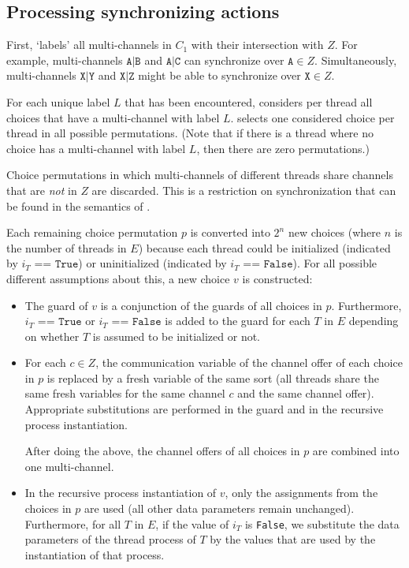\subsection{Processing synchronizing actions}

First, \lpeq{} `labels' all multi-channels in $C_1$ with their intersection with $Z$.
For example, multi-channels $\texttt{A|B}$ and $\texttt{A|C}$ can synchronize over $\texttt{A} \in Z$.
Simultaneously, multi-channels $\texttt{X|Y}$ and $\texttt{X|Z}$ might be able to synchronize over $\texttt{X} \in Z$.

For each unique label $L$ that has been encountered, \lpeq{} considers per thread all choices that have a multi-channel with label $L$.
\lpeq{} selects one considered choice per thread in all possible permutations.
(Note that if there is a thread where no choice has a multi-channel with label $L$, then there are zero permutations.)

Choice permutations in which multi-channels of different threads share channels that are \emph{not} in $Z$ are discarded.
This is a restriction on synchronization that can be found in the semantics of \txs{}.

Each remaining choice permutation $p$ is converted into $2^n$ new choices (where $n$ is the number of threads in $E$) because each thread could be initialized (indicated by $i_T \texttt{ == True}$) or uninitialized (indicated by $i_T \texttt{ == False}$).
For all possible different assumptions about this, a new choice $v$ is constructed:
\begin{itemize}
\item The guard of $v$ is a conjunction of the guards of all choices in $p$.
Furthermore, $i_T \texttt{ == True}$ or $i_T \texttt{ == False}$ is added to the guard for each $T$ in $E$ depending on whether $T$ is assumed to be initialized or not.
\item For each $c \in Z$, the communication variable of the channel offer of each choice in $p$ is replaced by a fresh variable of the same sort (all threads share the same fresh variables for the same channel $c$ and the same channel offer).
Appropriate substitutions are performed in the guard and in the recursive process instantiation.

After doing the above, the channel offers of all choices in $p$ are combined into one multi-channel.
\item In the recursive process instantiation of $v$, only the assignments from the choices in $p$ are used (all other data parameters remain unchanged).
Furthermore, for all $T$ in $E$, if the value of $i_T$ is \texttt{False}, we substitute the data parameters of the thread process of $T$ by the values that are used by the instantiation of that process.
\end{itemize}

